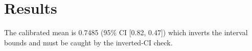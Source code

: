 \section{Results}
The calibrated mean is 0.7485 (95\% CI [0.82, 0.47]) which inverts the
interval bounds and must be caught by the inverted-CI check.
